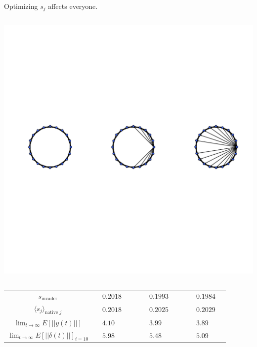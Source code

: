 \documentclass{beamer}
\newcommand{\ra}[1]{\renewcommand{\arraystretch}{#1}}
\begin{document}
\begin{frame}
Optimizing $s_j$ affects everyone. 
\begin{columns}[c]
\includegraphics[width=\textwidth]{three_networks.pdf}
\end{columns}
    \ra{1.3}
    \begin{tabular}{@{}clllllllllll@{}}
    $s_\text{invader}$  & & $0.2018$ & & & & $0.1993$ & & & & $0.1984$ 
    \\ $\langle s_j\rangle_{\text{native }j}$ & & $0.2018$ & & & & $0.2025$ & & & & $0.2029$
   \\ \small{$\lim_{t\to\infty} E[||y(t)||]$} & & $4.10$ & & & & $3.99$ & & & & $3.89$
    \\ \small{$\lim_{t\to\infty} E[||\delta(t)||]_{i=10}$} & & $5.98$ & & & & $5.48$ & & & & $5.09$
   \end{tabular}
\end{frame}
\end{document}
